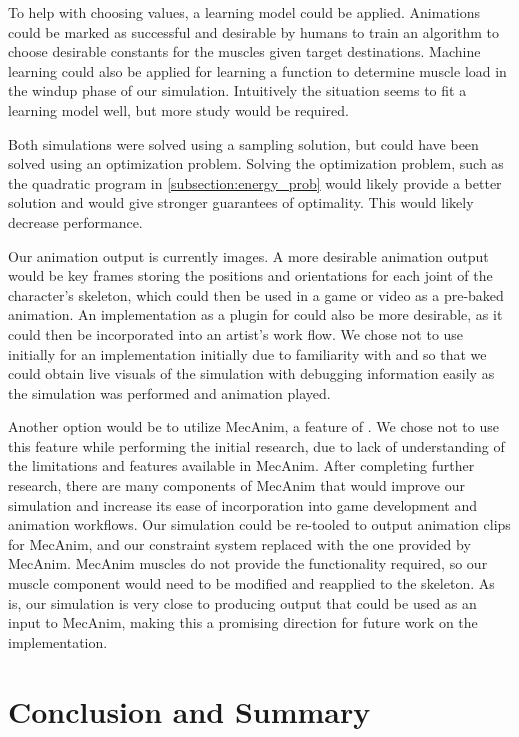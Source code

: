 To help with choosing values, a learning model could be applied.  Animations could be marked as successful and desirable by humans to train an algorithm to choose desirable constants for the muscles given target destinations.  Machine learning could also be applied for learning a function to determine muscle load in the windup phase of our simulation.  Intuitively the situation seems to fit a learning model well, but more study would be required.

Both simulations were solved using a sampling solution, but could have been solved using an optimization problem.  Solving the optimization problem, such as the quadratic program in \ref{subsection:energy_prob} would likely provide a better solution and would give stronger guarantees of optimality.  This would likely decrease performance.

Our animation output is currently images.  A more desirable animation output would be key frames storing the positions and orientations for each joint of the character's skeleton, which could then be used in a game or video as a pre-baked animation.  An implementation as a plugin for \maya could also be more desirable, as it could then be incorporated into an artist's work flow.  We chose not to use \maya initially for an implementation initially due to familiarity with \unity and so that we could obtain live visuals of the simulation with debugging information easily as the simulation was performed and animation played.

Another option would be to utilize MecAnim, a feature of \unity.  We chose not to use this feature while performing the initial research, due to lack of understanding of the limitations and features available in MecAnim.  After completing further research, there are many components of MecAnim that would improve our simulation and increase its ease of incorporation into game development and animation workflows.  Our simulation could be re-tooled to output animation clips for MecAnim, and our constraint system replaced with the one provided by MecAnim.  MecAnim muscles do not provide the functionality required, so our muscle component would need to be modified and reapplied to the skeleton.  As is, our simulation is very close to producing output that could be used as an input to MecAnim, making this a promising direction for future work on the implementation.

\section{Conclusion and Summary}
\label{section:conclusion}

